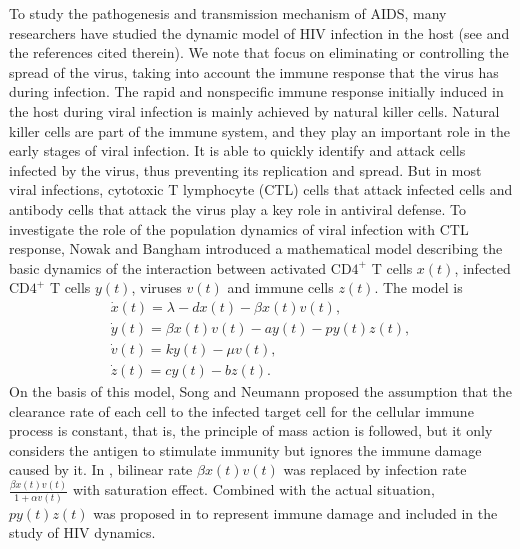 \documentclass[10pt,a4paper]{amsart}
\numberwithin{equation}{section}
\begin{document}
To  study the pathogenesis and transmission mechanism of AIDS, many researchers 
have studied the dynamic model of HIV infection in the host
(see \cite{LW2, NA, NB, Sa, WL} and the references cited therein).
 We note that \cite{NA} focus on eliminating or controlling the spread of the virus, 
taking into account the immune response that the virus has during
infection. The rapid and nonspecific immune response initially induced in the host 
during viral infection is mainly achieved by natural killer cells. 
Natural killer cells are part of the immune system,
and they play an important role in the early stages of viral infection. 
It is able to quickly identify and attack cells infected by the virus, thus 
preventing its  replication and spread. 
But in most viral infections, cytotoxic T lymphocyte (CTL) cells that attack infected 
cells and antibody cells that attack the virus play a  key role in antiviral defense. 
To investigate the role of the population dynamics of viral infection with 
CTL response, Nowak and Bangham \cite{NB} introduced a  mathematical model describing 
the basic dynamics of the interaction between activated CD$4^{+}$ T cells $x(t)$, 
infected CD$4^{+}$ T cells $y(t)$, viruses  $v(t)$ and
 immune cells $z(t)$. The model is 
\begin{equation}\label{1.2}
\begin{gathered}
\dot{x}(t)=\lambda-dx(t)-\beta x(t)v(t),\\
\dot{y}(t)=\beta x(t)v(t)-ay(t)-py(t)z(t),\\
\dot{v}(t)=ky(t)-\mu v(t),\\
\dot{z}(t)=cy(t)-bz(t).
\end{gathered}
\end{equation}
On the basis of this model, Song and Neumann \cite{SN} proposed the 
assumption that the clearance rate of each cell to the infected target cell for the 
cellular immune process is constant, that is, the principle of mass action is followed, 
but it only considers the antigen to stimulate immunity but ignores the immune damage 
caused by it. In  \cite{SN}, bilinear rate $\beta x(t)v(t)$ was replaced by infection 
rate $\frac{\beta x(t)v(t)}{1+\alpha v(t)}$ with saturation effect. Combined with
the actual situation, $py(t)z(t)$ was proposed in \cite{HZ,QJ, RW} to represent immune 
damage and included in the study of HIV dynamics. 
\end{document}
